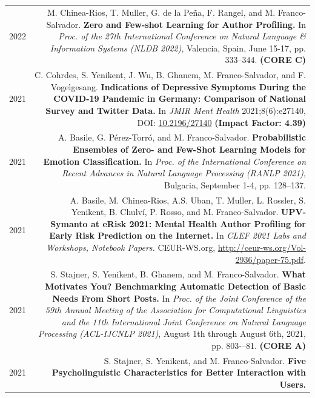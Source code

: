 \documentclass[10pt]{article}
\begin{document}
\section*{}
\begin{tabular}{L!{\VRule}R}
	2022 & M. Chinea-Rios, T. Muller, G. de la Pe\~{n}a, F. Rangel, and M. Franco-Salvador. \textbf{Zero and Few-shot Learning for Author Profiling.}
	In \emph{Proc. of the 27th International Conference on Natural Language \& Information Systems (NLDB 2022)}, Valencia, Spain, June 15-17, pp. 333--344. \textbf{(CORE C)} \vspace{5pt}\\
    2021 & C. Cohrdes, S. Yenikent, J. Wu, B. Ghanem, M. Franco-Salvador, and F. Vogelgesang. \textbf{Indications of Depressive Symptoms During the COVID-19 Pandemic in Germany: Comparison of National Survey and Twitter Data.}
	In \emph{JMIR Ment Health} 2021;8(6):e27140, DOI: \href{https://doi.org/10.2196/27140}{10.2196/27140} \textbf{(Impact Factor: 4.39)} \vspace{5pt}\\
	2021 & A. Basile, G. P{\'e}rez-Torr{\'o}, and M. Franco-Salvador. \textbf{Probabilistic Ensembles of Zero- and Few-Shot Learning Models for Emotion Classification.}
	In \emph{Proc. of the International Conference on Recent Advances in Natural Language Processing (RANLP 2021)}, Bulgaria, September 1-4, pp. 128--137. \vspace{5pt}\\
	2021 & A. Basile, M. Chinea-Rios, A.S. Uban, T. Muller, L. Rossler, S. Yenikent, B. Chulv{\'i}, P. Rosso, and M. Franco-Salvador. \textbf{UPV-Symanto at eRisk 2021: Mental Health Author Profiling for Early Risk Prediction on the Internet.}
	In \emph{CLEF 2021 Labs and Workshops, Notebook Papers.} CEUR-WS.org, \href{http://ceur-ws.org/Vol-2936/paper-75.pdf}{http://ceur-ws.org/Vol-2936/paper-75.pdf}. \vspace{5pt}\\
	2021 & S. Stajner, S. Yenikent, B. Ghanem, and M. Franco-Salvador. \textbf{What Motivates You? Benchmarking Automatic Detection of Basic Needs From Short Posts.}
	In \emph{Proc. of the Joint Conference of the 59th Annual Meeting of the Association for Computational Linguistics and the 11th International Joint Conference on Natural Language Processing (ACL-IJCNLP 2021)}, August 1th through August 6th, 2021, pp.  803-–81. \textbf{(CORE A)}\vspace{5pt}\\
	2021 & S. Stajner, S. Yenikent, and M. Franco-Salvador. \textbf{Five Psycholinguistic Characteristics for Better Interaction with Users.}

\end{tabular}
\end{document}
